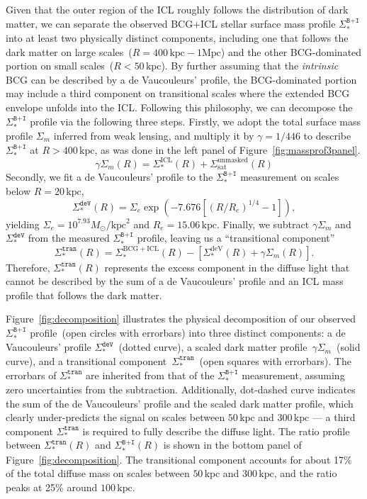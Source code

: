 \documentclass[fleqn,usenatbib]{mnras}
\newcommand{\sigbi}{\Sigma_*^{\texttt{B+I}}}
\newcommand{\sigm}{\Sigma_m}
\newcommand{\sigdev}{\Sigma_*^{\texttt{deV}}}
\newcommand{\sigtr}{\Sigma_*^{\texttt{tran}}}
\newcommand{\mpc}{\mathrm{Mpc}}
\newcommand{\kpc}{\mathrm{kpc}}
\newcommand{\msol}{M_{\odot}}
\begin{document}
Given that the outer region of the ICL roughly follows the distribution of
dark matter, we can separate the observed BCG+ICL stellar surface mass
profile $\sigbi$ into at least two physically distinct components,
including one that follows the dark matter on large
scales~($R{=}400\,\kpc{-}1\mpc$) and the other BCG-dominated portion on small
scales~($R{<}50\,\kpc$). By further assuming that the {\it intrinsic} BCG
can be described by a de Vaucouleurs' profile, the BCG-dominated portion
may include a third component on transitional scales where the extended BCG
envelope unfolds into the ICL. Following this philosophy, we can decompose
the $\sigbi$ profile via the following three steps. Firstly, we adopt the
total surface mass profile $\sigm$ inferred from weak lensing, and
multiply it by $\gamma{=}1/446$ to
describe $\sigbi$ at $R{>}400\,\kpc$, as was done in the left panel of
Figure~\ref{fig:massprof3panel}.
\begin{equation}
    \gamma \sigm(R) = \Sigma_*^{\mathrm{ICL}}(R)  +
    \Sigma_{\mathrm{sat}}^{\mathrm{unmasked}}(R)
    \label{eqn:sigmaicl}
\end{equation}
Secondly, we fit a de Vaucouleurs' profile to the $\sigbi$ measurement on
scales below $R{=}20\,\kpc$,
\begin{equation}
    \sigdev(R) = \Sigma_{e} \exp \left( -7.676 \left[\left(R/R_{e}\right)^{1/4} -
    1\right]\right),
\label{eqn:sigmabcg}
\end{equation}
yielding $\Sigma_{e}{=}10^{7.93}\msol/\kpc^2$ and $R_{e}{=}15.06\,\kpc$. Finally, we subtract
$\gamma \sigm$ and $\sigdev$ from the measured $\sigbi$ profile,
leaving us a ``transitional component''
\begin{equation}
    \sigtr(R) = \Sigma_*^{\mathrm{BCG+ICL}}(R) -
    \left[\Sigma_*^{\mathrm{deV}}(R) + \gamma \sigm(R)\right].
    \label{eqn:sigmatran}
\end{equation}
Therefore, $\sigtr(R)$ represents the excess component in the diffuse light
that cannot be described by the sum of a de Vaucouleurs' profile and an ICL
mass profile that follows the dark matter.


Figure~\ref{fig:decomposition} illustrates the physical decomposition of
our observed $\sigbi$ profile~(open circles with errorbars) into three
distinct components: a de Vaucouleurs' profile $\sigdev$~(dotted curve), a
scaled dark matter profile~$\gamma\sigm$~(solid curve), and a transitional
component~$\sigtr$~(open squares with errorbars).  The errorbars of
$\sigtr$ are inherited from that of the $\sigbi$ measurement, assuming zero
uncertainties from the subtraction. Additionally, dot-dashed curve indicates
the sum of the de Vaucouleurs' profile and the scaled dark matter profile,
which clearly under-predicts the signal on scales between $50\,\kpc$ and
$300\,\kpc$ --- a third component $\sigtr$ is required to fully describe
the diffuse light.  The ratio profile between $\sigtr(R)$ and $\sigbi(R)$
is shown in the bottom panel of Figure~\ref{fig:decomposition}. The
transitional component accounts for about 17\% of the total diffuse
mass on scales between $50\,\kpc$ and $300\,\kpc$, and the ratio peaks
at 25\% around $100\,\kpc$.
\end{document}
